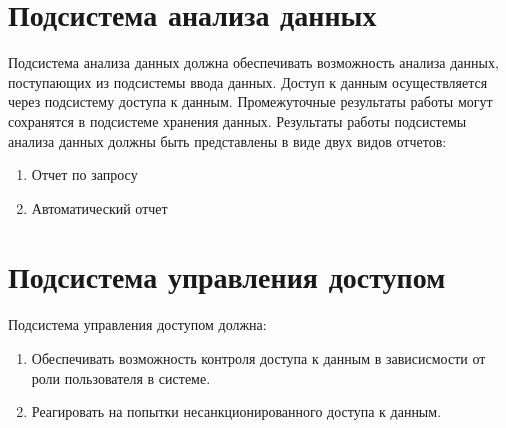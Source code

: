 \section{Подсистема анализа данных}
Подсистема анализа данных должна обеспечивать возможность анализа данных,
поступающих из подсистемы ввода данных. Доступ к данным осуществляется через
подсистему доступа к данным. Промежуточные результаты работы могут сохранятся в
подсистеме хранения данных.
Результаты работы подсистемы анализа данных должны быть представлены в виде двух
видов отчетов:

\begin{enumerate}
  \item Отчет по запросу
  \item Автоматический отчет
\end{enumerate}

\section{Подсистема управления доступом}
Подсистема управления доступом должна:
\begin{enumerate}
  \item Обеспечивать возможность контроля доступа к данным в зависисмости от роли пользователя в системе.
  \item Реагировать на попытки несанкционированного доступа к данным.
\end{enumerate}
